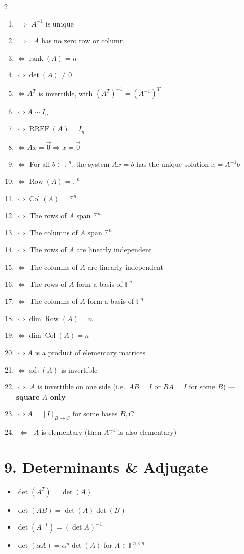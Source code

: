 \documentclass[fleqn]{article}
\begin{document}
\begin{multicols}{2}
\begin{enumerate}
\item $\;\Longrightarrow\; A^{-1}$ is unique
\item $\;\Longrightarrow\;$ $A$ has no zero row or column
\item $\iff \operatorname{rank}(A)=n$
\item $\iff \det(A)\neq 0$
\item $\iff A^T$ is invertible, with $(A^T)^{-1}=(A^{-1})^T$
\item $\iff A \sim I_n$
\item $\iff \operatorname{RREF}(A)=I_n$
\item $\iff Ax=\vec{0} \Rightarrow x=\vec{0}$
\item $\iff$ For all $b\in\mathbb{F}^n$, the system $Ax=b$ has the unique solution $x=A^{-1}b$
\item $\iff \operatorname{Row}(A)=\mathbb{F}^n$
\item $\iff \operatorname{Col}(A)=\mathbb{F}^n$
\item $\iff$ The rows of $A$ span $\mathbb{F}^n$
\item $\iff$ The columns of $A$ span $\mathbb{F}^n$
\item $\iff$ The rows of $A$ are linearly independent
\item $\iff$ The columns of $A$ are linearly independent
\item $\iff$ The rows of $A$ form a basis of $\mathbb{F}^n$
\item $\iff$ The columns of $A$ form a basis of $\mathbb{F}^n$
\item $\iff \dim \operatorname{Row}(A)=n$
\item $\iff \dim \operatorname{Col}(A)=n$
\item $\iff A$ is a product of elementary matrices
\item $\iff \operatorname{adj}(A)$ is invertible
\item $\iff$ $A$ is invertible on one side (i.e.\ $AB=I$ or $BA=I$ for some $B$) --- \textbf{square $A$ only}
\item $\iff A=[I]_{B \to C}$ for some bases $B,C$
\item $\;\Longleftarrow\;$ $A$ is elementary (then $A^{-1}$ is also elementary)
\end{enumerate}

\section*{9. Determinants \& Adjugate}
\begin{itemize}
\item $\det(A^T)=\det(A)$
\item $\det(AB)=\det(A)\det(B)$
\item $\det(A^{-1}) = (\det A)^{-1}$
\item $\det(\alpha A)=\alpha^n \det(A)$ for $A \in \mathbb{F}^{n\times n}$
\end{itemize}


\end{multicols}
\end{document}
